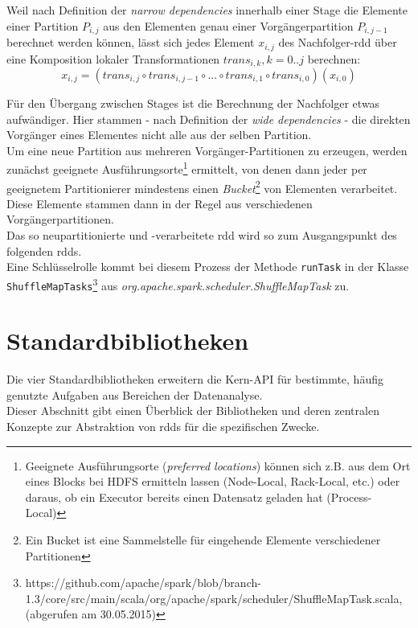 Weil nach Definition der \textit{narrow dependencies} innerhalb einer Stage die Elemente einer Partition \(P_{i,j}\) aus den Elementen genau einer Vorgängerpartition \(P_{i,j-1}\) berechnet werden können, lässt sich jedes Element \(x_{i,j}\) des Nachfolger-\gls{rdd} über eine Komposition lokaler Transformationen \(trans_{i,k}, k = 0..j\) berechnen:\\ 

\[x_{i,j} = (trans_{i,j} \circ trans_{i,j-1} \circ ... \circ trans_{i,1}\circ trans_{i,0})(x_{i,0})\]

Für den Übergang zwischen Stages ist die Berechnung der Nachfolger etwas aufwändiger. Hier stammen - nach Definition der \textit{wide dependencies} - die direkten Vorgänger eines Elementes nicht alle aus der selben Partition.\\

Um eine neue Partition aus mehreren Vorgänger-Partitionen zu erzeugen, werden zunächst geeignete Ausführungsorte\footnote{Geeignete Ausführungsorte (\textit{preferred locations}) können sich z.B. aus dem Ort eines Blocks bei HDFS ermitteln lassen (Node-Local, Rack-Local, etc.) oder daraus, ob ein Executor bereits einen Datensatz geladen hat (Process-Local)} ermittelt, von denen dann jeder per geeignetem Partitionierer mindestens einen \textit{Bucket}\footnote{Ein Bucket ist eine Sammelstelle für eingehende Elemente verschiedener Partitionen} von Elementen verarbeitet. Diese Elemente stammen dann in der Regel aus verschiedenen Vorgängerpartitionen.\\
Das so neupartitionierte und -verarbeitete \gls{rdd} wird so zum Ausgangspunkt des folgenden \glspl{rdd}.\\
Eine Schlüsselrolle kommt bei diesem Prozess der Methode \lstinline|runTask| in der Klasse \lstinline|ShuffleMapTasks|\footnote{https://github.com/apache/spark/blob/branch-1.3/core/src/main/scala/org/apache/spark/scheduler/ShuffleMapTask.scala, (abgerufen am 30.05.2015)} aus \textit{org.apache.spark.scheduler.ShuffleMapTask} zu.\\

\section{Standardbibliotheken}
Die vier Standardbibliotheken erweitern die Kern-API für bestimmte, häufig genutzte Aufgaben aus Bereichen der Datenanalyse.\\

Dieser Abschnitt gibt einen Überblick der Bibliotheken und deren zentralen Konzepte zur Abstraktion von \glspl{rdd} für die spezifischen Zwecke.\\

